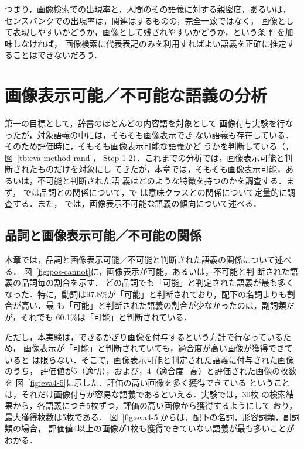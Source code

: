 \documentclass[japanese]{jnlp_1.4}
\newcommand{\izs}[1]{}
\newcommand{\refsec}[1]{}
\begin{document}
つまり，画像検索での出現率と，人間のその語義に対する親密度，あるいは，
センスバンクでの出現率は，関連はするものの，完全一致ではなく，
画像として表現しやすいかどうか，画像として残されやすいかどうか，という条
件を加味しなければ，
画像検索に代表表記のみを利用すればよい語義を正確に推定することはできないだろう．



\section{画像表示可能／不可能な語義の分析}
\label{sec:ana-cannot}

\vspace{-0.2\Cvs}
第一の目標として，辞書のほとんどの内容語を対象として
画像付与実験を行なったが，対象語義の中には，そもそも画像表示でき
ない語義も存在している．そのため評価時に，そもそも画像表示可能な語義かど
うかを判断している（\refsec{sec:exp-steps}，図~\ref{tb:eva-method-rand}，
Step 1-2）．これまでの分析では，画像表示可能と判断されたものだけを対象にし
てきたが，本章では，そもそも画像表示可能，あるいは，不可能と判断された語
義はどのような特徴を持つのかを調査する．まず，
\refsec{sec:pos-cannot}では品詞との関係について，\refsec{sec:iz-cannot}で
は意味クラスとの関係について定量的に調査する．また，
\refsec{sec:ex-cannot}では，画像表示不可能な語義の傾向について述べる．


\subsection{品詞と画像表示可能／不可能の関係}
\label{sec:pos-cannot}


本章では，品詞と画像表示可能／不可能と判断された語義の関係について述べる．
図~\ref{fig:pos-cannot}に，画像表示が可能，あるいは，不可能と判
断された語義の品詞毎の割合を示す．
どの品詞でも「可能」と判定された語義が最も多くなった．特に，動詞は97.8\%が「可能」と判断されており，\izs{2:具体}配下の名詞よりも割合が高い．最
も「可能」と判断された語義の割合が少なかったのは，副詞類だが，それでも
60.1\%は「可能」と判断されている．

ただし，本実験は，できるかぎり画像を付与するという方針で行なっているため，
画像表示が「可能」と判断されていても，適合度が高い画像が獲得できていると
は限らない．そこで，画像表示可能と判定された語義に付与された画像のうち，
評価値が5（適切），および，4（適合度\_高）と評価された画像の枚数を
図~\ref{fig:eva4-5}に示した．評価の高い画像を多く獲得できている
ということは，それだけ画像付与が容易な語義であるといえる．実験では，30枚
の検索結果から，各語義につき5枚ずつ，評価の高い画像から獲得するようにして
おり，最大獲得枚数は5枚である．
図~\ref{fig:eva4-5}からは，\izs{1000:抽象}配下の名詞，形容詞類，副詞類の場合，
評価値4以上の画像が1枚も獲得できていない語義が最も多いことがわかる．
\end{document}
